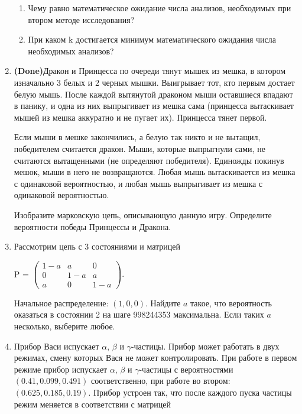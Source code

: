 \documentclass[a4paper, 14pt]{extarticle}
\begin{document}
\begin{enumerate}
\begin{enumerate}
	\item Чему равно математическое ожидание числа анализов, необходимых при
	втором методе исследования?
	\item При каком k достигается минимум математического ожидания числа  
	необходимых анализов?
	\end{enumerate}
 \item \textbf{(Done)}Дракон и Принцесса по очереди тянут мышек из мешка, в котором изначально $3$ белых и $2$ черных мышки. Выигрывает тот, кто первым достает белую мышь. После каждой вытянутой драконом мыши оставшиеся впадают в панику, и одна из них выпрыгивает из мешка сама (принцесса вытаскивает мышей из мешка аккуратно и не пугает их). Принцесса тянет первой.

Если мыши в мешке закончились, а белую так никто и не вытащил, победителем считается дракон. Мыши, которые выпрыгнули сами, не считаются вытащенными (не определяют победителя). Единожды покинув мешок, мыши в него не возвращаются. Любая мышь вытаскивается из мешка с одинаковой вероятностью, и любая мышь выпрыгивает из мешка с одинаковой вероятностью.

Изобразите марковскую цепь, описывающую данную игру. Определите вероятности победы Принцессы и Дракона.

\item Рассмотрим цепь с 3 состояниями и матрицей

\begin{center}
    P = $\left ( \begin{array}{ccc}
        1 - a & a & 0 \\
        0 & 1 - a & a \\
        a & 0 & 1 - a
    \end{array} \right ).$
\end{center}

Начальное распределение: $\left ( 1, 0, 0 \right )$. Найдите $a$ такое, что вероятность оказаться в состоянии 2 на шаге 998244353 максимальна. Если таких $a$ несколько, выберите любое.

\item Прибор Васи испускает $\alpha$, $\beta$ и $\gamma$-частицы. Прибор может работать в двух режимах, смену которых Вася не может контролировать. При работе в первом режиме прибор испускает $\alpha$, $\beta$ и $\gamma$-частицы с вероятностями $\left ( 0.41, 0.099, 0.491 \right )$ соответственно, при работе во втором: $\left ( 0.625, 0.185, 0.19 \right )$. Прибор устроен так, что после каждого пуска частицы режим меняется в соответствии с матрицей


\end{enumerate}
\end{document}
